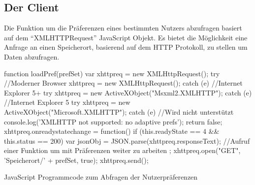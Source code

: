 \documentclass[12pt, paper=a4, bibtotoc, toc=listof, headsepline=true, numbers=endperiod]{scrreprt}
\begin{document}
\subsection{Der Client}
Die Funktion um die Präferenzen eines bestimmten Nutzers abzufragen basiert auf dem \enquote{XMLHTTPRequest} JavaScript Objekt. Es bietet die Möglichkeit eine Anfrage an einen Speicherort, basierend auf dem \ac{HTTP} Protokoll, zu stellen um Daten abzufragen.
\begin{listing}
	\begin{JavaScriptcode*}{}
function loadPref(prefSet) {
   var xhttpreq = new XMLHttpRequest();
   try{
      //Moderner Browser
      xhttpreq = new XMLHttpRequest();
   }catch (e){
      //Internet Explorer 5+
      try{
         xhttpreq = new ActiveXObject("Msxml2.XMLHTTP");
      }catch (e) {
         //Internet Explorer 5
         try{
            xhttpreq = new ActiveXObject("Microsoft.XMLHTTP");
         }catch (e){
             //Wird nicht unterstützt
             console.log('XMLHTTP not supported: no adaptive prefs');
             return false;
         }
      }
   }
   xhttpreq.onreadystatechange = function() {
      if (this.readyState == 4 && this.status == 200) {
         var jsonObj = JSON.parse(xhttpreq.responseText);
         //Aufruf einer Funktion um mit Präferenzen weiter zu arbeiten
      }
   };
   xhttpreq.open("GET", 'Speicherort/' + prefSet, true);
   xhttpreq.send(); 	
}
	\end{JavaScriptcode*}
	\caption[Abfragen der Nutzerpräferenzen]{JavaScript Programmcode zum Abfragen der Nutzerpräferenzen}
	\label{lst:jquAja}
\end{listing}
\end{document}
